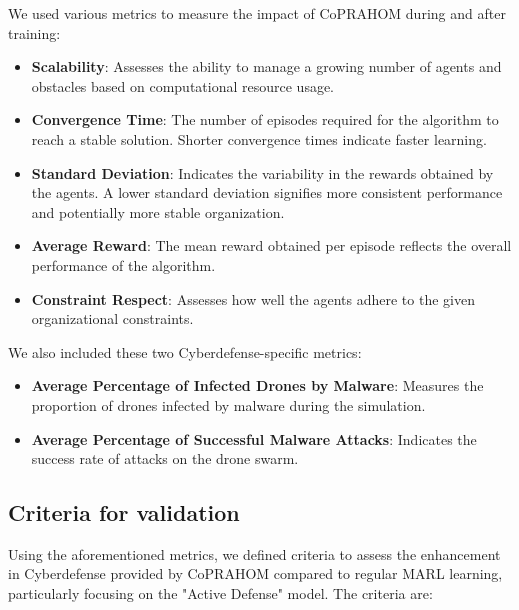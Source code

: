 \documentclass[conference]{IEEEtran}
\begin{document}
We used various metrics to measure the impact of CoPRAHOM during and after training:
\begin{itemize}
    \item \textbf{Scalability}: Assesses the ability to manage a growing number of agents and obstacles based on computational resource usage.
    \item \textbf{Convergence Time}: The number of episodes required for the algorithm to reach a stable solution. Shorter convergence times indicate faster learning.
    \item \textbf{Standard Deviation}: Indicates the variability in the rewards obtained by the agents. A lower standard deviation signifies more consistent performance and potentially more stable organization.
    \item \textbf{Average Reward}: The mean reward obtained per episode reflects the overall performance of the algorithm.
    \item \textbf{Constraint Respect}: Assesses how well the agents adhere to the given organizational constraints. %
\end{itemize}

We also included these two Cyberdefense-specific metrics:
\begin{itemize}
    \item \textbf{Average Percentage of Infected Drones by Malware}: Measures the proportion of drones infected by malware during the simulation.
    \item \textbf{Average Percentage of Successful Malware Attacks}: Indicates the success rate of attacks on the drone swarm.
\end{itemize}

\subsection{Criteria for validation}

Using the aforementioned metrics, we defined criteria to assess the enhancement in Cyberdefense provided by CoPRAHOM compared to regular MARL learning, particularly focusing on the "Active Defense" model. The criteria are:
\end{document}
